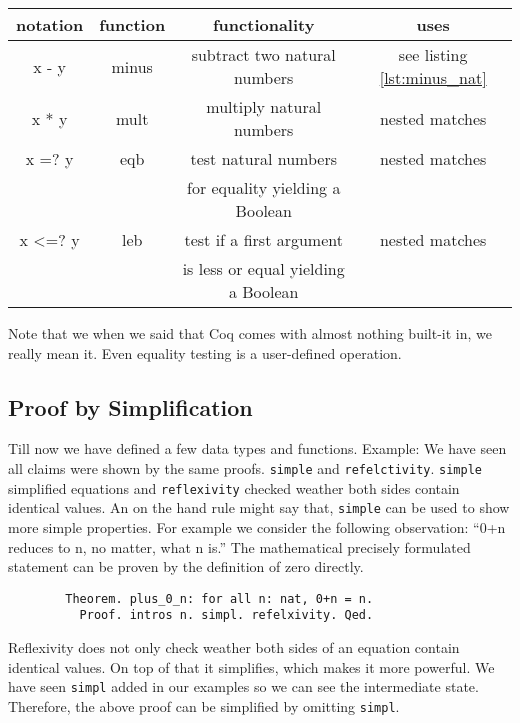    \begin{center}
   \begin{tabular}{|c|c|c|c|}
     \hline 
 	  notation      & function        & functionality                       & uses           \\  \hline
 	  x - y         & minus           & subtract two natural numbers       & see listing  \ref{lst:minus_nat} \\  \hline
      x * y         & mult            & multiply natural numbers            & nested matches \\  \hline   
   	  x =? y        & eqb             & test natural numbers                & nested matches \\  
  	                &                 & for equality yielding a Boolean     &                \\  \hline
   	  x <=? y       & leb             & test if a first argument            & nested matches \\  
   	                &                 & is less or equal yielding a Boolean &                \\  \hline
   \end{tabular}
   \end{center}
	Note that we when we said that Coq comes with almost nothing built-it in, we really mean it.
    Even equality testing is a user-defined operation.
    
    
        
   \subsection{Proof by Simplification}
   
   
   Till now we have defined a few data types and functions.
   Example: We have seen all claims were shown by the same proofs. \lstinline!simple! and \lstinline!refelctivity!. 
   \lstinline!simple! simplified equations and \lstinline!reflexivity! checked weather both sides contain identical values.
   An on the hand rule might say that, \lstinline!simple! can be used to show more simple properties.
   For example we consider the following observation: ``0+n reduces to n, no matter, what n is.''
   The mathematical precisely formulated statement can be proven by the definition of zero directly.
   
   \begin{example}
	   \begin{theorem}
  	   \begin{lstlisting}
   		Theorem. plus_0_n: for all n: nat, 0+n = n.
   		  Proof. intros n. simpl. refelxivity. Qed.
    	\end{lstlisting}	
	\end{theorem}
	\end{example}              
    \begin{remark}
    	Reflexivity does not only check weather both sides of an equation contain identical values. 
    	On top of that it simplifies, which makes it more powerful. 
    	We have seen \lstinline!simpl! added in our examples so we can see the intermediate state.
    	Therefore, the above proof can be simplified by omitting \lstinline!simpl!. 
     \end{remark}


